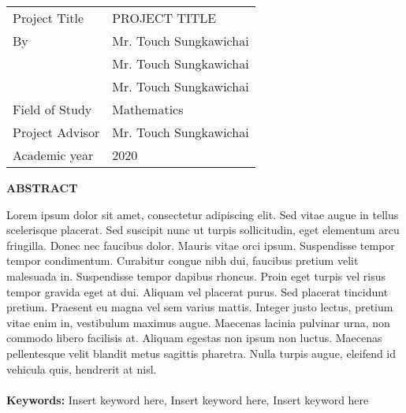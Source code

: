 \fontbody
\begin{tabular}{l l}
Project Title & PROJECT TITLE \\
By & Mr. Touch Sungkawichai \\
& Mr. Touch Sungkawichai \\
& Mr. Touch Sungkawichai \\
Field of Study & Mathematics \\
Project Advisor & Mr. Touch Sungkawichai \\
Academic year & 2020 \\

\end{tabular}

\begin{center}
    \fontheading
    \textbf{ABSTRACT} 
\end{center}

\fontbody
Lorem ipsum dolor sit amet, consectetur adipiscing elit. Sed vitae augue in tellus scelerisque placerat. Sed suscipit nunc ut turpis sollicitudin, eget elementum arcu fringilla. Donec nec faucibus dolor. Mauris vitae orci ipsum. Suspendisse tempor tempor condimentum. Curabitur congue nibh dui, faucibus pretium velit malesuada in. Suspendisse tempor dapibus rhoncus. Proin eget turpis vel risus tempor gravida eget at dui. Aliquam vel placerat purus. Sed placerat tincidunt pretium. Praesent eu magna vel sem varius mattis. Integer justo lectus, pretium vitae enim in, vestibulum maximus augue. Maecenas lacinia pulvinar urna, non commodo libero facilisis at. Aliquam egestas non ipsum non luctus. Maecenas pellentesque velit blandit metus sagittis pharetra. Nulla turpis augue, eleifend id vehicula quis, hendrerit at nisl. \\\\

\noindent \textbf{Keywords: } 
Insert keyword here, Insert keyword here, Insert keyword here